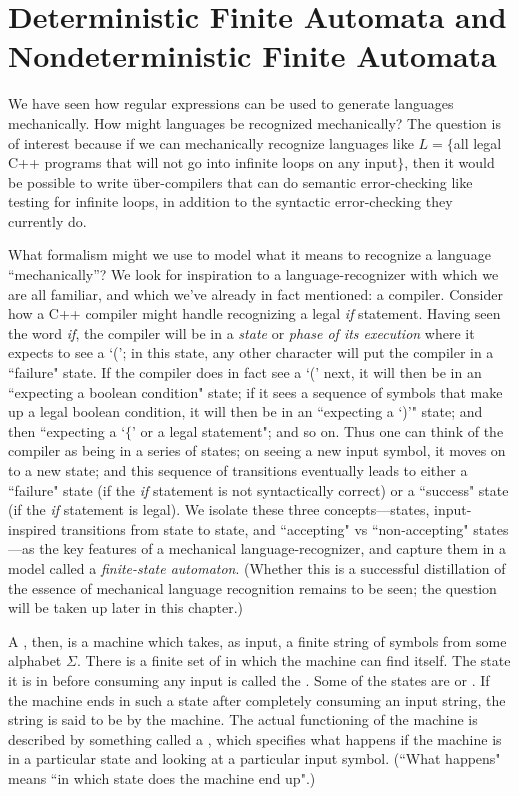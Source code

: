 \section{Deterministic Finite Automata and Nondeterministic Finite Automata}\label{S-fsa-1}

We have seen how regular expressions can be used to generate languages mechanically.
How might languages be recognized mechanically? 
The question is of interest because if we can mechanically recognize languages
like $L= \{$all legal C++ programs that will not go into infinite loops on any
input$\}$, then it would be possible to write \"uber-compilers that can do
semantic error-checking like testing for infinite loops, in addition to the
syntactic error-checking they currently do.

What formalism might we use to model what it means to recognize a language
``mechanically''?  We look for inspiration to a language-recognizer with which
we are all familiar, and which we've already in fact mentioned: a compiler.
Consider how a C++ compiler might handle recognizing a legal {\em if}
statement.  Having seen the word {\em if}, the compiler will be in a {\em state}
or {\em phase of its execution} where it expects to see a `('; in this state,
any other character will put the compiler in a ``failure" state.  If the compiler
does in fact see a `(' next, it will then be in an ``expecting a boolean
condition" state; if it sees a sequence of symbols that make up a legal boolean
condition, it will then be in an ``expecting a `)'" state; and then ``expecting
a `$\{$' or a legal statement"; and so on.  Thus one can think of the compiler as
being in a series of states; on seeing a new input symbol, it moves on to a new
state; and this sequence of transitions eventually leads to either a ``failure"
state (if the {\em if} statement is not syntactically correct) or a ``success"
state (if the {\em if} statement is legal).  We isolate these three
concepts---states, input-inspired transitions from state to state, and
``accepting" vs ``non-accepting" states---as the key features of a mechanical
language-recognizer, and capture them in a model called a {\em finite-state
automaton}.  (Whether this is a successful distillation of the essence of
mechanical language recognition remains to be seen; the question will be taken
up later in this chapter.)

A , then, is a machine which takes, as input, 
a finite
string of symbols from some alphabet $\Sigma$.
There is a finite set of  in which the machine can find itself.  The
state it is in before consuming any input is called the .
Some of the states are 
or .  If the machine ends in such a state after completely consuming
an input string, the string is said to be  by the machine.
The actual functioning of the machine is described by something called a 
, which specifies 
what happens if the machine is in a particular state and looking at a
particular input symbol.  (``What happens" means ``in which state does the
machine end up".)    

